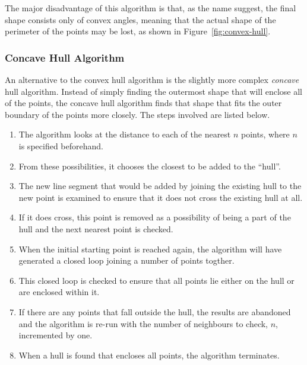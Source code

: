 The major disadvantage of this algorithm is that, as the name suggest, the
final shape consists only of convex angles, meaning that the actual shape of
the perimeter of the points may be lost, as shown in
Figure~\ref{fig:convex-hull}.


\subsubsection*{Concave Hull Algorithm}
\label{ssub:Concave Hull Algorithm}

An alternative to the convex hull algorithm is the slightly more complex
\emph{concave} hull algorithm\cite{moreira2007concave}. Instead of simply
finding the outermost shape that will enclose all of the points, the concave
hull algorithm finds that shape that fits the outer boundary of the points more
closely. The steps involved are listed below.

\begin{enumerate}
	\item The algorithm looks at the distance to each of the nearest $n$
		points, where $n$ is specified beforehand.
	\item From these possibilities, it chooses the closest to be added to the
		``hull''.
	\item The new line segment that would be added by joining the existing hull
		to the new point is examined to ensure that it does not cross the
		existing hull at all.
	\item If it does cross, this point is removed as a possibility of being a
		part of the hull and the next nearest point is checked.
	\item When the initial starting point is reached again, the algorithm will
		have generated a closed loop joining a number of points togther.
	\item This closed loop is checked to ensure that all points lie either on
		the hull or are enclosed within it.
	\item If there are any points that fall outside the hull, the results are
		abandoned and the algorithm is re-run with the number of neighbours to
		check, $n$, incremented by one.
	\item When a hull is found that encloses all points, the algorithm
		terminates.
\end{enumerate}

